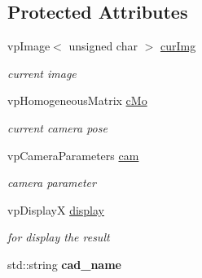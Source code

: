 \subsection*{\-Protected \-Attributes}
\begin{DoxyCompactItemize}
\item 
\hypertarget{classbaseTracker_a6edb382071777cddaf254bc6734b8fa3}{vp\-Image$<$ unsigned char $>$ \hyperlink{classbaseTracker_a6edb382071777cddaf254bc6734b8fa3}{cur\-Img}}\label{classbaseTracker_a6edb382071777cddaf254bc6734b8fa3}

\begin{DoxyCompactList}\small\item\em current image \end{DoxyCompactList}\item 
\hypertarget{classbaseTracker_a853f58bceb6082909a5956a7824d4d69}{vp\-Homogeneous\-Matrix \hyperlink{classbaseTracker_a853f58bceb6082909a5956a7824d4d69}{c\-Mo}}\label{classbaseTracker_a853f58bceb6082909a5956a7824d4d69}

\begin{DoxyCompactList}\small\item\em current camera pose \end{DoxyCompactList}\item 
\hypertarget{classbaseTracker_a8b52e677c30f1f8d3e7b6998c18d4369}{vp\-Camera\-Parameters \hyperlink{classbaseTracker_a8b52e677c30f1f8d3e7b6998c18d4369}{cam}}\label{classbaseTracker_a8b52e677c30f1f8d3e7b6998c18d4369}

\begin{DoxyCompactList}\small\item\em camera parameter \end{DoxyCompactList}\item 
\hypertarget{classbaseTracker_a2855b0e26cf9992a8f5785300525bb6e}{vp\-Display\-X \hyperlink{classbaseTracker_a2855b0e26cf9992a8f5785300525bb6e}{display}}\label{classbaseTracker_a2855b0e26cf9992a8f5785300525bb6e}

\begin{DoxyCompactList}\small\item\em for display the result \end{DoxyCompactList}\item 
\hypertarget{classbaseTracker_a5cc247766a9d0044bb5bf48a98c1bbf0}{std\-::string {\bfseries cad\-\_\-name}}\label{classbaseTracker_a5cc247766a9d0044bb5bf48a98c1bbf0}

\end{DoxyCompactItemize}


